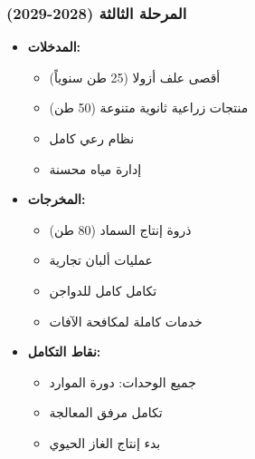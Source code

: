\subsubsection{المرحلة الثالثة (2028-2029)}
\begin{itemize}
    \item \textbf{المدخلات:}
    \begin{itemize}
        \item أقصى علف أزولا (25 طن سنوياً)
        \item منتجات زراعية ثانوية متنوعة (50 طن)
        \item نظام رعي كامل
        \item إدارة مياه محسنة
    \end{itemize}
    \item \textbf{المخرجات:}
    \begin{itemize}
        \item ذروة إنتاج السماد (80 طن)
        \item عمليات ألبان تجارية
        \item تكامل كامل للدواجن
        \item خدمات كاملة لمكافحة الآفات
    \end{itemize}
    \item \textbf{نقاط التكامل:}
    \begin{itemize}
        \item جميع الوحدات: دورة الموارد
        \item تكامل مرفق المعالجة
        \item بدء إنتاج الغاز الحيوي
    \end{itemize}
\end{itemize}

